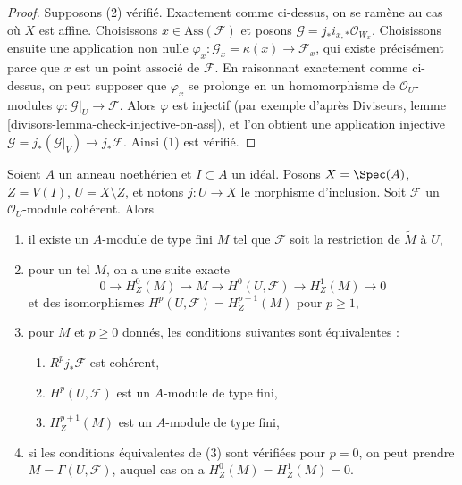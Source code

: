 \begin{proof}
\medskip\noindent
Supposons (2) vérifié. Exactement comme ci-dessus, on se ramène au cas où $X$ est affine. Choisissons $x \in \text{Ass}(\mathcal{F})$ et posons $\mathcal{G} = j_*i_{x, *}\mathcal{O}_{W_x}$. Choisissons ensuite une application non nulle $\varphi_x : \mathcal{G}_x = \kappa(x) \to \mathcal{F}_x$, qui existe précisément parce que $x$ est un point associé de $\mathcal{F}$. En raisonnant exactement comme ci-dessus, on peut supposer que $\varphi_x$ se prolonge en un homomorphisme de $\mathcal{O}_U$-modules $\varphi : \mathcal{G}|_U \to \mathcal{F}$. Alors $\varphi$ est injectif (par exemple d'après Diviseurs, lemme \ref{divisors-lemma-check-injective-on-ass}), et l'on obtient une application injective $\mathcal{G} = j_*(\mathcal{G}|_V) \to j_*\mathcal{F}$. Ainsi (1) est vérifié.
\end{proof}

\begin{lemma}
\label{lemma-finiteness-pushforwards-and-H1-local}
Soient $A$ un anneau noethérien et $I \subset A$ un idéal. Posons $X = \Spec(A)$, $Z = V(I)$, $U = X \setminus Z$, et notons $j : U \to X$ le morphisme d'inclusion. Soit $\mathcal{F}$ un $\mathcal{O}_U$-module cohérent. Alors
\begin{enumerate}
\item il existe un $A$-module de type fini $M$ tel que $\mathcal{F}$ soit la restriction de $\widetilde{M}$ à $U$,
\item pour un tel $M$, on a une suite exacte
$$
0 \to H^0_Z(M) \to M \to H^0(U, \mathcal{F}) \to H^1_Z(M) \to 0
$$
et des isomorphismes $H^p(U, \mathcal{F}) = H^{p + 1}_Z(M)$ pour $p \geq 1$,
\item pour $M$ et $p \geq 0$ donnés, les conditions suivantes sont équivalentes :
\begin{enumerate}
\item $R^pj_*\mathcal{F}$ est cohérent,
\item $H^p(U, \mathcal{F})$ est un $A$-module de type fini,
\item $H^{p + 1}_Z(M)$ est un $A$-module de type fini,
\end{enumerate}
\item si les conditions équivalentes de (3) sont vérifiées pour $p = 0$, on peut prendre $M = \Gamma(U, \mathcal{F})$, auquel cas on a $H^0_Z(M) = H^1_Z(M) = 0$.
\end{enumerate}
\end{lemma}

